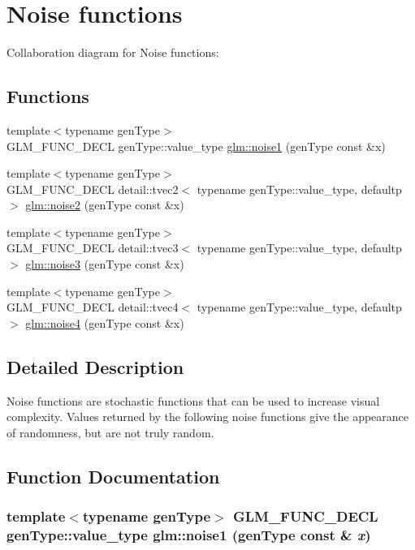 \hypertarget{group__core__func__noise}{
\section{Noise functions}
\label{group__core__func__noise}
}


Collaboration diagram for Noise functions:\subsection*{Functions}
\begin{CompactItemize}
\item 
{\footnotesize template$<$typename genType$>$ }\\GLM\_\-FUNC\_\-DECL genType::value\_\-type \hyperlink{group__core__func__noise_g678a5c0934a5bebef68e27dcd2c0b17f}{glm::noise1} (genType const \&x)
\item 
{\footnotesize template$<$typename genType$>$ }\\GLM\_\-FUNC\_\-DECL detail::tvec2$<$ typename genType::value\_\-type, defaultp $>$ \hyperlink{group__core__func__noise_gb56ac2b6d1f0353dab3119c1d741f319}{glm::noise2} (genType const \&x)
\item 
{\footnotesize template$<$typename genType$>$ }\\GLM\_\-FUNC\_\-DECL detail::tvec3$<$ typename genType::value\_\-type, defaultp $>$ \hyperlink{group__core__func__noise_gbdb9942a4dae6ea82bf5a801aa376979}{glm::noise3} (genType const \&x)
\item 
{\footnotesize template$<$typename genType$>$ }\\GLM\_\-FUNC\_\-DECL detail::tvec4$<$ typename genType::value\_\-type, defaultp $>$ \hyperlink{group__core__func__noise_g1b0e265d42fa1abacdf1980959d80f78}{glm::noise4} (genType const \&x)
\end{CompactItemize}


\subsection{Detailed Description}
Noise functions are stochastic functions that can be used to increase visual complexity. Values returned by the following noise functions give the appearance of randomness, but are not truly random. 

\subsection{Function Documentation}
\hypertarget{group__core__func__noise_g678a5c0934a5bebef68e27dcd2c0b17f}{
\subsubsection[noise1]{\setlength{\rightskip}{0pt plus 5cm}template$<$typename genType$>$ GLM\_\-FUNC\_\-DECL genType::value\_\-type glm::noise1 (genType const \& {\em x})}}
\label{group__core__func__noise_g678a5c0934a5bebef68e27dcd2c0b17f}


